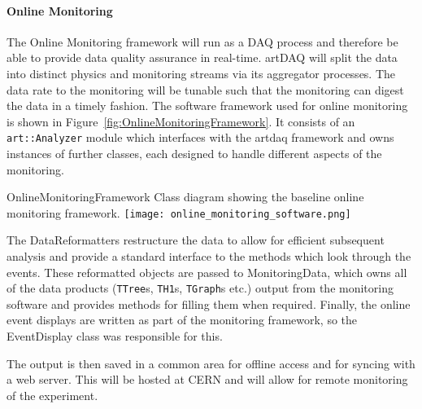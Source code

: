 \paragraph{Online Monitoring}
The Online Monitoring framework will run as a DAQ process and therefore be
able to provide data quality assurance in real-time. artDAQ will split the  
data into distinct physics and monitoring streams via its aggregator processes.  
The data rate to the monitoring will be tunable such that the monitoring 
can digest the data in a timely fashion.
The software framework used for online monitoring is
shown in Figure~\ref{fig:OnlineMonitoringFramework}.  It consists of an
\texttt{art::Analyzer} module which interfaces with the artdaq framework and
owns instances of further classes, each designed to handle different aspects
of the monitoring.  

\begin{cdrfigure}{OnlineMonitoringFramework}{
    Class diagram showing the baseline online monitoring framework. 
    }
  \texttt{[image: online\_monitoring\_software.png]}
\end{cdrfigure}

The DataReformatters restructure the data to allow for efficient subsequent
analysis and provide a standard interface to the methods which look through
the events.  These reformatted objects are passed to MonitoringData, which
owns all of the data products (\texttt{TTree}s, \texttt{TH1}s, \texttt{TGraph}s
etc.) output from the monitoring software and provides methods for filling
them when required.  Finally, the online event displays are
written as part of the monitoring framework, so the EventDisplay class was
responsible for this.  

The output is then saved in a common area for offline access and for syncing
with a web server. This will be hosted at CERN and will allow for remote
monitoring of the experiment.

